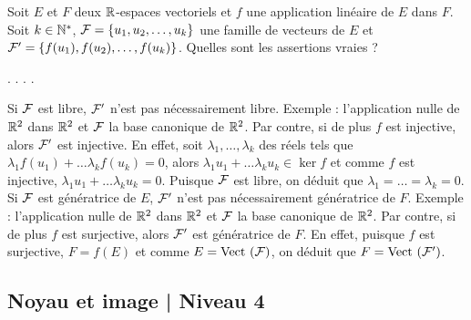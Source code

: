 \begin{question}
Soit $E$ et $F$ deux $\mathbb{R}$-espaces vectoriels et $f$ une application linéaire de $E$ dans $F$. Soit $k\in \mathbb{N}^*$, ${\cal F} = \{u_1,u_2, \dots , u_k\}$ une famille de vecteurs de $E$ et ${\cal F}' = \{f(u_1),f(u_2), \dots , f(u_k)\}$. Quelles sont les assertions vraies ?
\begin{answers}  
.
.
.
.
\end{answers}
\begin{explanations} Si ${\cal F}$ est libre, ${\cal F}'$ n'est pas nécessairement libre. Exemple : l'application nulle de $\mathbb{R}^2$ dans $\mathbb{R}^2$ et ${\cal F}$ la base canonique de $\mathbb{R}^2$.
\vskip0mm
Par contre, si de plus $f$ est injective, alors ${\cal F}'$ est injective. En effet, soit $\lambda_1, \dots ,\lambda_k $ des réels tels que $\lambda_1f(u_1)+ \dots \lambda_kf(u_k)=0 $, alors 
$\lambda_1u_1+ \dots \lambda_ku_k \in \ker f$ et comme $f$ est injective, $\lambda_1u_1+ \dots \lambda_ku_k=0$. Puisque ${\cal F}$ est libre, on déduit que  $\lambda_1= \dots= \lambda_k=0 $.
\vskip0mm
Si ${\cal F}$ est génératrice de $E$, ${\cal F}'$ n'est pas nécessairement génératrice de $F$. Exemple : l'application nulle de 
$\mathbb{R}^2$ dans $\mathbb{R}^2$ et ${\cal F}$ la base canonique de $\mathbb{R}^2$.
\vskip0mm
Par contre, si de plus $f$ est surjective, alors ${\cal F}'$ est génératrice de $F$. En effet, puisque $f$ est surjective, $F=f(E)$ et comme  $E=\mbox{Vect} \, \left({\cal F}\right)$, on déduit que $F=\mbox{Vect} \, \left({\cal F'}\right)$.
\end{explanations}
\end{question}

\subsection{Noyau et image  | Niveau 4}

